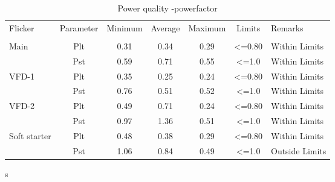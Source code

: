 \begin{table}[!htb]
	\caption{Power quality -powerfactor}
	\label{tbl_ch04_elecaudit_powerquality_flicker}
	{\scriptsize
		
\begin{tabular}{l|l|l|l|l|l|l}
\hline
Flicker & \multicolumn{1}{c|}{Parameter} & \multicolumn{1}{c|}{Minimum} & \multicolumn{1}{c|}{Average} & \multicolumn{1}{c|}{Maximum} & \multicolumn{1}{c|}{Limits} & Remarks \\ 
& \multicolumn{1}{c|}{} & \multicolumn{1}{c|}{} & \multicolumn{1}{c|}{} & \multicolumn{1}{c|}{} & \multicolumn{1}{c|}{} &  \\ 
\hline
Main & \multicolumn{1}{c|}{Plt} & \multicolumn{1}{c|}{0.31} & \multicolumn{1}{c|}{0.34} & \multicolumn{1}{c|}{0.29} & \multicolumn{1}{c|}{<=0.80} & Within Limits \\ 
& \multicolumn{1}{c|}{Pst} & \multicolumn{1}{c|}{0.59} & \multicolumn{1}{c|}{0.71} & \multicolumn{1}{c|}{0.55} & \multicolumn{1}{c|}{<=1.0} & Within Limits \\ 
\hline
VFD-1 & \multicolumn{1}{c|}{Plt} & \multicolumn{1}{c|}{0.35} & \multicolumn{1}{c|}{0.25} & \multicolumn{1}{c|}{0.24} & \multicolumn{1}{c|}{<=0.80} & Within Limits \\ 
& \multicolumn{1}{c|}{Pst} & \multicolumn{1}{c|}{0.76} & \multicolumn{1}{c|}{0.51} & \multicolumn{1}{c|}{0.52} & \multicolumn{1}{c|}{<=1.0} & Within Limits \\ 
\hline
VFD-2 & \multicolumn{1}{c|}{Plt} & \multicolumn{1}{c|}{0.49} & \multicolumn{1}{c|}{0.71} & \multicolumn{1}{c|}{0.24} & \multicolumn{1}{c|}{<=0.80} & Within Limits \\ 
& \multicolumn{1}{c|}{Pst} & \multicolumn{1}{c|}{0.97} & \multicolumn{1}{c|}{1.36} & \multicolumn{1}{c|}{0.51} & \multicolumn{1}{c|}{<=1.0} & Within Limits \\ 
\hline
Soft starter & \multicolumn{1}{c|}{Plt} & \multicolumn{1}{c|}{0.48} & \multicolumn{1}{c|}{0.38} & \multicolumn{1}{c|}{0.29} & \multicolumn{1}{c|}{<=0.80} & Within Limits \\ 
& \multicolumn{1}{c|}{Pst} & \multicolumn{1}{c|}{1.06} & \multicolumn{1}{c|}{0.84} & \multicolumn{1}{c|}{0.49} & \multicolumn{1}{c|}{<=1.0} & Outside Limits \\ 
\hline
\end{tabular}s
		
	}%
\end{table}